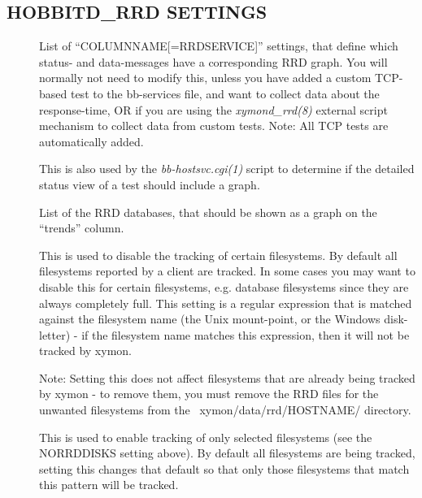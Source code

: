 \subsection{HOBBITD\_RRD SETTINGS}


 \begin{description}

\item[] List of ``COLUMNNAME[=RRDSERVICE]'' settings,
  that define which status- and data-messages have a corresponding RRD
  graph. You will normally not need to modify this, unless you have
  added a custom TCP-based test to the bb-services file, and want to
  collect data about the response-time, OR if you are using the
  \emph{xymond\_rrd(8)} external script mechanism to collect data
  from custom tests. Note: All TCP tests are automatically added. 



  This is also used by the \emph{bb-hostsvc.cgi(1) } script to
  determine if the detailed status view of a test should include a
  graph. 



 

\item[] List of the RRD databases, that should be shown
  as a graph on the ``trends'' column. 


 

\item[] This is used to disable the tracking of
  certain filesystems. By default all filesystems reported by a client
  are tracked. In some cases you may want to disable this for certain
  filesystems, e.g. database filesystems since they are always
  completely full. This setting is a regular expression that is
  matched against the filesystem name (the Unix mount-point, or the
  Windows disk-letter) - if the filesystem name matches this
  expression, then it will not be tracked by xymon.  

 Note: Setting this does not affect filesystems that are already being
 tracked by xymon - to remove them, you must remove the RRD files for
 the unwanted filesystems from the ~xymon/data/rrd/HOSTNAME/
 directory. 


 

\item[] This is used to enable tracking of only
  selected filesystems (see the NORRDDISKS setting above). By default
  all filesystems are being tracked, setting this changes that default
  so that only those filesystems that match this pattern will be
  tracked. 


 


 


\end{description}

